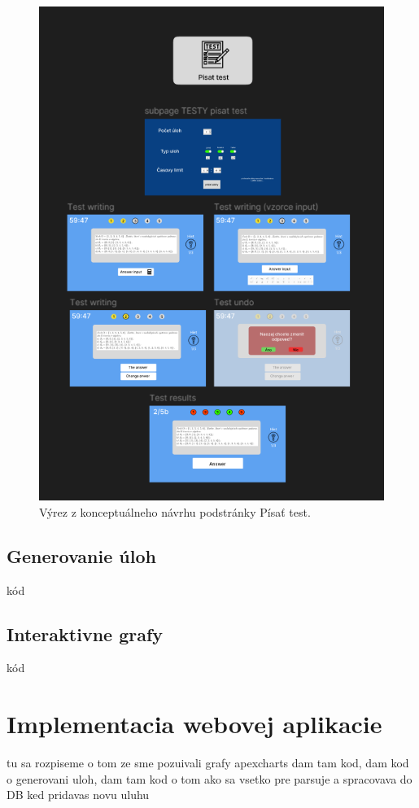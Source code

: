 \begin{figure}[htbp]
  \centering
  \includegraphics[width=16cm]{img/figma_screen.png}
  \caption{Výrez z konceptuálneho návrhu podstránky Písať test.}
  \label{figmavizual}
\end{figure} 

\subsection{Generovanie úloh}
kód
\subsection{Interaktivne grafy}
kód



 \section{Implementacia webovej aplikacie}
 tu sa rozpiseme o tom ze sme pozuivali grafy apexcharts dam tam kod, dam kod o generovani uloh, dam tam kod o tom ako sa vsetko pre parsuje a spracovava do DB ked pridavas novu uluhu 

